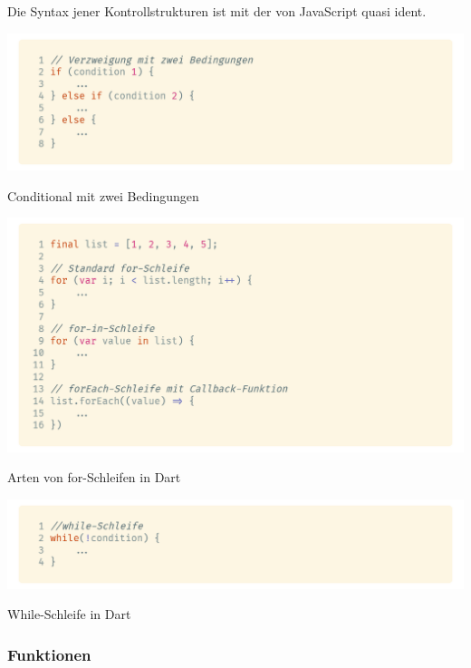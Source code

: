 Die Syntax jener Kontrollstrukturen ist mit der von JavaScript quasi ident.

\begin{code}[H]
    \centering
    \includegraphics[width=1\textwidth]{images/Dart/theory/dartConditional.png}
    \vspace{-25pt}
    \caption{Conditional mit zwei Bedingungen}
\end{code}

\begin{code}[H]
    \centering
    \includegraphics[width=1\textwidth]{images/Dart/theory/dartForLoop.png}
    \vspace{-25pt}
    \caption{Arten von for-Schleifen in Dart}
\end{code}

\begin{code}[H]
    \centering
    \includegraphics[width=1\textwidth]{images/Dart/theory/dartWhileLoops.png}
    \vspace{-25pt}
    \caption{While-Schleife in Dart}
\end{code}

\newpage

\subsubsection{Funktionen}

